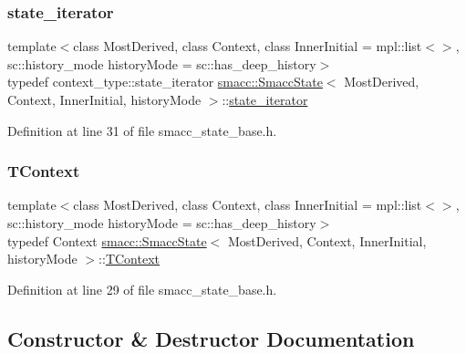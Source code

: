 \subsubsection{\texorpdfstring{state\+\_\+iterator}{state\_iterator}}
{\footnotesize\ttfamily template$<$class Most\+Derived, class Context, class Inner\+Initial = mpl\+::list$<$$>$, sc\+::history\+\_\+mode history\+Mode = sc\+::has\+\_\+deep\+\_\+history$>$ \\
typedef context\+\_\+type\+::state\+\_\+iterator \hyperlink{classsmacc_1_1SmaccState}{smacc\+::\+Smacc\+State}$<$ Most\+Derived, Context, Inner\+Initial, history\+Mode $>$\+::\hyperlink{classsmacc_1_1SmaccState_a12497b38e710f07cacb5d45efc024339}{state\+\_\+iterator}}



Definition at line 31 of file smacc\+\_\+state\+\_\+base.\+h.

\mbox{\label{classsmacc_1_1SmaccState_a9953ba0428a8c46f7d72c70bc3f87db4}} 
\subsubsection{\texorpdfstring{T\+Context}{TContext}}
{\footnotesize\ttfamily template$<$class Most\+Derived, class Context, class Inner\+Initial = mpl\+::list$<$$>$, sc\+::history\+\_\+mode history\+Mode = sc\+::has\+\_\+deep\+\_\+history$>$ \\
typedef Context \hyperlink{classsmacc_1_1SmaccState}{smacc\+::\+Smacc\+State}$<$ Most\+Derived, Context, Inner\+Initial, history\+Mode $>$\+::\hyperlink{classsmacc_1_1SmaccState_a9953ba0428a8c46f7d72c70bc3f87db4}{T\+Context}}



Definition at line 29 of file smacc\+\_\+state\+\_\+base.\+h.



\subsection{Constructor \& Destructor Documentation}
\mbox{\label{classsmacc_1_1SmaccState_a2fbeaca0f063a909d17de2c3040c8d17}} 
